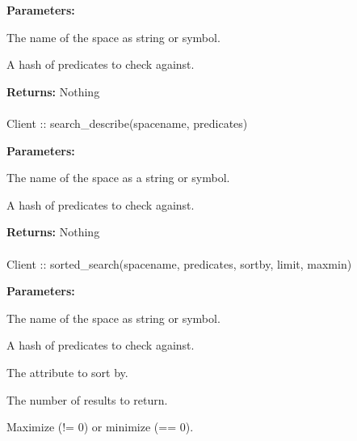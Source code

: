 \noindent\textbf{Parameters:}
\begin{description}[labelindent=\widthof{{predicates}},leftmargin=*,noitemsep,nolistsep,align=right]
\item[spacename] The name of the space as string or symbol.
\item[predicates] A hash of predicates to check against.
\end{description}

\noindent\textbf{Returns:}
Nothing

\paragraph{}
\begin{ccode}
Client :: search_describe(spacename, predicates)
\end{ccode}
\funcdesc 

\noindent\textbf{Parameters:}
\begin{description}[labelindent=\widthof{{predicates}},leftmargin=*,noitemsep,nolistsep,align=right]
\item[spacename] The name of the space as a string or symbol.
\item[predicates] A hash of predicates to check against.
\end{description}

\noindent\textbf{Returns:}
Nothing

\paragraph{}
\begin{ccode}
Client :: sorted_search(spacename, predicates, sortby, limit, maxmin)
\end{ccode}
\funcdesc 

\noindent\textbf{Parameters:}
\begin{description}[labelindent=\widthof{{predicates}},leftmargin=*,noitemsep,nolistsep,align=right]
\item[spacename] The name of the space as string or symbol.
\item[predicates] A hash of predicates to check against.
\item[sortby] The attribute to sort by.
\item[limit] The number of results to return.
\item[maxmin] Maximize (!= 0) or minimize (== 0).
\end{description}

